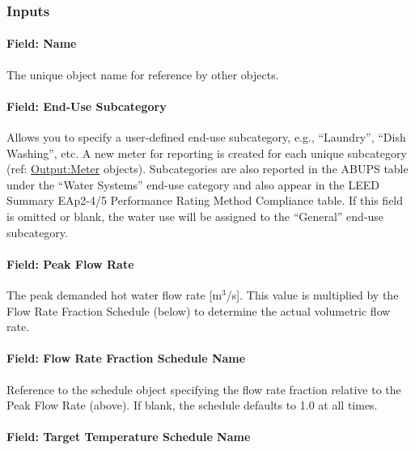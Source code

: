 \subsubsection{Inputs}\label{inputs-053}

\paragraph{Field: Name}\label{field-name-051}

The unique object name for reference by other objects.

\paragraph{Field: End-Use Subcategory}\label{field-end-use-subcategory-005}

Allows you to specify a user-defined end-use subcategory, e.g., ``Laundry'', ``Dish Washing'', etc. A new meter for reporting is created for each unique subcategory (ref: \hyperref[outputmeter-and-outputmetermeterfileonly]{Output:Meter} objects). Subcategories are also reported in the ABUPS table under the ``Water Systems'' end-use category and also appear in the LEED Summary EAp2-4/5 Performance Rating Method Compliance table. If this field is omitted or blank, the water use will be assigned to the ``General'' end-use subcategory.

\paragraph{Field: Peak Flow Rate}\label{field-peak-flow-rate-000}

The peak demanded hot water flow rate {[}m\(^{3}\)/s{]}. This value is multiplied by the Flow Rate Fraction Schedule (below) to determine the actual volumetric flow rate.

\paragraph{Field: Flow Rate Fraction Schedule Name}\label{field-flow-rate-fraction-schedule-name-000}

Reference to the schedule object specifying the flow rate fraction relative to the Peak Flow Rate (above). If blank, the schedule defaults to 1.0 at all times.

\paragraph{Field: Target Temperature Schedule Name}\label{field-target-temperature-schedule-name}

